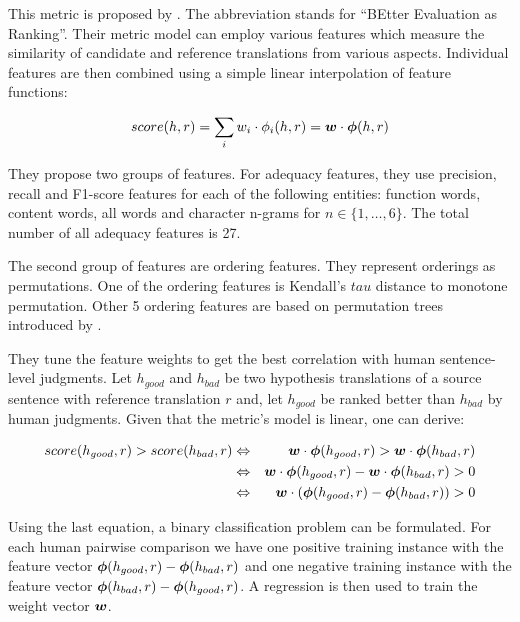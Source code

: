 This metric is proposed by . The abbreviation
stands for ``BEtter Evaluation as Ranking''. Their metric model can employ
various features which measure the similarity of candidate and reference
translations from various aspects.  Individual features are then combined using
a simple linear interpolation of feature functions:

\begin{equation*}
    score(h,r) = \sum_i w_i \cdot \phi_i(h,r) = \boldsymbol{w} \cdot \boldsymbol{\phi}(h,r)
\end{equation*}

They propose two groups of features. For adequacy features, they use precision,
recall and F1-score features for each of the following entities: function
words, content words, all words and character n-grams for $n \in \{1, \ldots,
6\}$. The total number of all adequacy features is 27.

The second group of features are ordering features. They represent orderings as
permutations. One of the ordering features is Kendall's $tau$ distance to
monotone permutation. Other 5 ordering features are based on permutation trees
introduced by .

They tune the feature weights to get the best correlation with human sentence-level
judgments. Let $h_{good}$ and $h_{bad}$ be two hypothesis translations of a source
sentence with reference translation $r$ and, let $h_{good}$ be ranked better than
$h_{bad}$ by human judgments.  Given that the metric's model is linear, one can
derive:

\begin{eqnarray*}
    score(h_{good},r) > score(h_{bad},r) & \Leftrightarrow & \boldsymbol{w} \cdot \boldsymbol{\phi}(h_{good},r) > \boldsymbol{w} \cdot \boldsymbol{\phi}(h_{bad},r) \\
                                         & \Leftrightarrow & \boldsymbol{w} \cdot \boldsymbol{\phi}(h_{good},r) - \boldsymbol{w} \cdot \boldsymbol{\phi}(h_{bad},r) > 0 \\
                                         & \Leftrightarrow & \boldsymbol{w} \cdot \left( \boldsymbol{\phi}(h_{good},r) - \boldsymbol{\phi}(h_{bad},r) \right) > 0
\end{eqnarray*}

Using the last equation, a binary classification problem can be formulated.  For
each human pairwise comparison we have one positive training instance with the
feature vector $\boldsymbol{\phi}(h_{good},r) - \boldsymbol{\phi}(h_{bad},r)$ and one
negative training instance with the feature vector $\boldsymbol{\phi}(h_{bad},r) -
\boldsymbol{\phi}(h_{good},r)$. A regression is then used to train the
weight vector $\boldsymbol{w}$.

